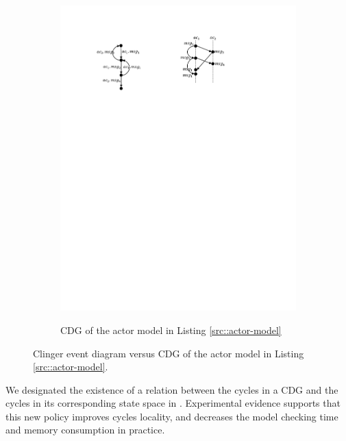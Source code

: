 \begin{figure}
\begin{subfigure}[b]{0.2\textwidth}
  \centering
  \small{
   \includegraphics[width=.8\textwidth]{resources/cdg.pdf}
  }
  \caption{CDG of the actor model in Listing \ref{src::actor-model}}
  \label{fig::cdg}
\end{subfigure}
\caption{Clinger event diagram versus CDG of the actor model in Listing \ref{src::actor-model}.}
\label{fig::clinger-cdg}
\end{figure}

We designated 
the existence of a relation between the cycles in a CDG and the cycles in its corresponding state space in \cite{DBLP:journals/eceasst/KhamespanahSMSR15}. 
%
Experimental evidence supports that this new policy improves cycles locality, and decreases the model checking time and memory consumption in practice.